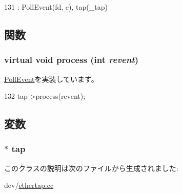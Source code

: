 \begin{DoxyCode}
131         : PollEvent(fd, e), tap(_tap) {}
\end{DoxyCode}


\subsection{関数}
\hypertarget{classTapEvent_a2b093972df00400e2325baed216afc46}{
\subsubsection[{process}]{\setlength{\rightskip}{0pt plus 5cm}virtual void process (int {\em revent})}}
\label{classTapEvent_a2b093972df00400e2325baed216afc46}


\hyperlink{classPollEvent_a8b870dc0eeb339499d64aa56fc0e2aa5}{PollEvent}を実装しています。


\begin{DoxyCode}
132 { tap->process(revent); }
\end{DoxyCode}


\subsection{変数}
\hypertarget{classTapEvent_afceac4e4f9153ef0f38b7c423422dd2e}{
\subsubsection[{tap}]{$\ast$ {\bf tap}}}
\label{classTapEvent_afceac4e4f9153ef0f38b7c423422dd2e}


このクラスの説明は次のファイルから生成されました:\begin{DoxyCompactItemize}
\item 
dev/\hyperlink{ethertap_8cc}{ethertap.cc}\end{DoxyCompactItemize}
